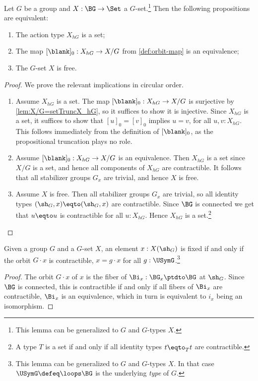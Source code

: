 \begin{lemma}\label{lem:X_hG-set-iff-Xfree}
Let $G$ be a group and $X:\BG\to\Set$ a $G$-set.\footnote{%
This lemma can be generalized to \inftygps $G$ and $G$-types $X$.}
Then the following propositions are equivalent:
\begin{enumerate}
\item The action type $X_{hG}$ is a set;
\item The map $[\blank]_0 :X_{hG}\to X/G$ from 
      \cref{def:orbit-map} is an equivalence;
\item The $G$-set $X$ is free.
\end{enumerate}
\end{lemma}
\begin{proof}
We prove the relevant implications in circular order.
\begin{enumerate}
\item Assume $X_{hG}$ is a set. The map  $[\blank]_0 :X_{hG}\to X/G$ is
surjective by \cref{lem:X/G=setTruncX_hG}, so it suffices to show
it is injective. Since $X_{hG}$ is a set, it suffices to
show that $[u]_0=[v]_0$ implies $u=v$, for all $u,v:X_{hG}$.
This follows immediately from the definition of $[\blank]_0$, 
as the propositional truncation plays no role.
\item Assume $[\blank]_0 :X_{hG}\to X/G$ is an equivalence.
Then $X_{hG}$ is a set since $X/G$ is a set, and hence
all components of $X_{hG}$ are contractible.
It follows that all stabilizer groups $G_x$ are trivial,
and hence $X$ is free.
\item Assume $X$ is free. Then all stabilizer groups $G_x$ are trivial,
so all identity types $(\sh_G,x)\eqto (\sh_G,x)$ are contractible.
Since $\BG$ is connected we get that $u\eqto u$ is contractible
for all $u:X_{hG}$. Hence $X_{hG}$ is a set.\footnote{%
A type $T$ is a set 
if and only if all identity types $t\eqto_T t$ are contractible.}\qedhere
\end{enumerate}
\end{proof}

\begin{lemma}\label{lem:fixed-char}
  Given a group $G$ and a $G$-set $X$, an element $x:X(\sh_G)$ is
 fixed if and only if the orbit $G\cdot x$ is contractible,
  \ie $x = g\cdot x$ for all $g:\USymG$.\footnote{%
  This lemma can be generalized to \inftygps $G$ and $G$-types $X$.
  In that case $\USymG\defeq\loops\BG$ is the underlying \emph{type} of $G$.}
\end{lemma}
\begin{proof}
  The orbit $G\cdot x$ of $x$ is the fiber of $\Bi_x : \BG_x \ptdto \BG$
  at $\sh_G$. Since $\BG$ is connected,
  this is contractible if and only if all fibers of $\Bi_x$ are contractible,
  \ie $\Bi_x$ is an equivalence, which in turn is equivalent to $i_x$
  being an isomorphism.
\end{proof}

